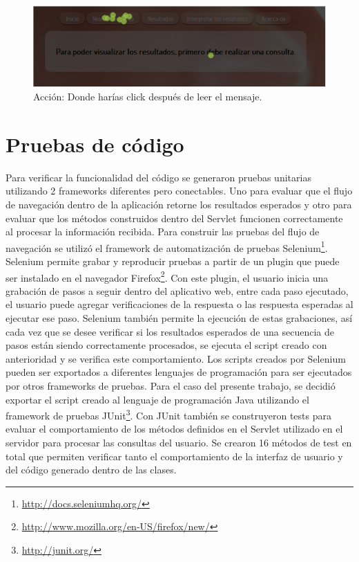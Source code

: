 \begin{figure}[!htb]
\begin{centering}
\includegraphics[scale=0.6]{realizarconsultatest}
\par\end{centering}
\caption{Acción: Donde harías click después de leer el mensaje.}
\label{fig:figura7}
\end{figure}
\section{Pruebas de código}
Para verificar la funcionalidad del código se generaron pruebas unitarias utilizando 2 frameworks diferentes pero conectables. Uno para evaluar que el flujo de navegación dentro de la aplicación retorne los resultados esperados y otro para evaluar que los métodos construidos dentro del Servlet funcionen correctamente al procesar la información recibida.
Para construir las pruebas del flujo de navegación se utilizó el framework de automatización de pruebas Selenium\footnote{\url{http://docs.seleniumhq.org/}}. Selenium permite grabar y reproducir pruebas a partir de un plugin que puede ser instalado en el navegador Firefox\footnote{\url{http://www.mozilla.org/en-US/firefox/new/}}. Con este plugin, el usuario inicia una grabación de pasos a seguir dentro del aplicativo web, entre cada paso ejecutado, el usuario puede agregar verificaciones de la respuesta o las respuesta esperadas al ejecutar ese paso.
Selenium también permite la ejecución de estas grabaciones, así cada vez que se desee verificar si los resultados esperados de una secuencia de pasos están siendo correctamente procesados, se ejecuta el script creado con anterioridad y se verifica este comportamiento.
Los scripts creados por Selenium pueden ser exportados a diferentes lenguajes de programación para ser ejecutados por otros frameworks de pruebas. Para el caso del presente trabajo, se decidió exportar el script creado al lenguaje de programación Java utilizando el framework de pruebas JUnit\footnote{\url{http://junit.org/}}.
Con JUnit también se construyeron tests para evaluar el comportamiento de los métodos definidos en el Servlet utilizado en el servidor para procesar las consultas del usuario. Se crearon 16 métodos de test en total que permiten verificar tanto el comportamiento de la interfaz de usuario y del código generado dentro de las clases.
